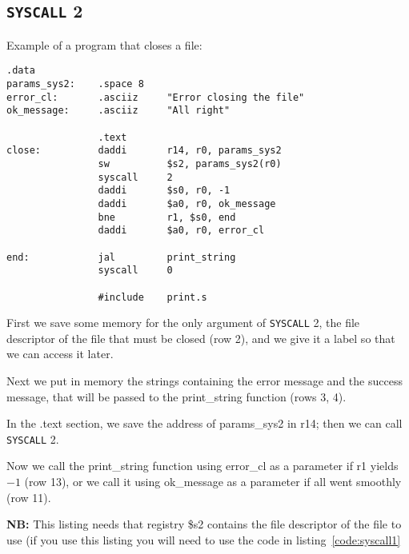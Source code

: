 \documentclass[12pt]{report}
\newcommand{\SC}{\texttt{SYSCALL}}
\newcommand{\OF}{\textbf{NB:} This listing needs that registry \$s2 contains the
file descriptor of the file to use (if you use this listing you will need to use
the code in listing~\ref{code:syscall1}}
\begin{document}
\subsection{\SC{} 2}
Example of a program that closes a file:
\begin{lstlisting}[caption={\SC{} 2 example}, label={code:syscall2}, style={mips}]
                .data
params_sys2:    .space 8
error_cl:       .asciiz     "Error closing the file"
ok_message:     .asciiz     "All right"

                .text
close:          daddi       r14, r0, params_sys2        
                sw          $s2, params_sys2(r0)    
                syscall     2            
                daddi       $s0, r0, -1        
                daddi       $a0, r0, ok_message            
                bne         r1, $s0, end            
                daddi       $a0, r0, error_cl

end:            jal         print_string
                syscall     0
    
                #include    print.s         
\end{lstlisting}
First we save some memory for the only argument of \SC{} 2, the file descriptor
of the file that must be closed (row 2), and we give it a label so that we can
access it later.

Next we put in memory the strings containing the error message and the success
message, that will be passed to the print\_string function (rows 3, 4).

In the .text section, we save the address of params\_sys2 in r14; then we can
call \SC{} 2.

Now we call the print\_string function using error\_cl as a parameter if r1
yields $-1$ (row 13), or we call it using ok\_message as a parameter if all went
smoothly (row 11).

\OF{}

\printindex
\end{document}
